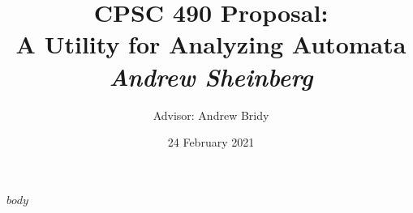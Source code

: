 \documentclass[12pt,letterpaper]{article}
\title{CPSC 490 Proposal:\\\textbf{A Utility for Analyzing Automata} \\ \emph{Andrew Sheinberg}}
\author{Advisor: Andrew Bridy}
\date{24 February 2021}
\begin{document}
$body$
\end{document}
